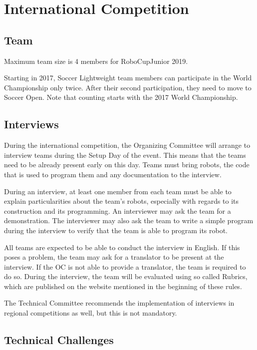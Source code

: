 \documentclass{article}
\begin{document}
\newpage

\section{International Competition}

\subsection{Team}

Maximum team size is 4 members for RoboCupJunior 2019.

Starting in 2017, Soccer Lightweight team members can participate in the World
Championship only twice. After their second participation, they need to move to
Soccer Open. Note that counting starts with the 2017 World Championship.

\subsection{Interviews \label{ref-060}}

During the international competition, the Organizing Committee will arrange to
interview teams during the Setup Day of the event. This means that the teams
need to be already present early on this day. Teams must bring robots, the code
that is used to program them and any documentation to the interview.

During an interview, at least one member from each team must be able to explain
particularities about the team's robots, especially with regards to its
construction and its programming. An interviewer may ask the team for a
demonstration. The interviewer may also ask the team to write a simple program
during the interview to verify that the team is able to program its robot.

All teams are expected to be able to conduct the interview in English. If this
poses a problem, the team may ask for a translator to be present at the
interview. If the OC is not able to provide a translator, the team is required
to do so. During the interview, the team will be evaluated using so called
Rubrics, which are published on the website mentioned in the beginning of these
rules.

The Technical Committee recommends the implementation of interviews in regional
competitions as well, but this is not mandatory.

\subsection{Technical Challenges}
\end{document}
